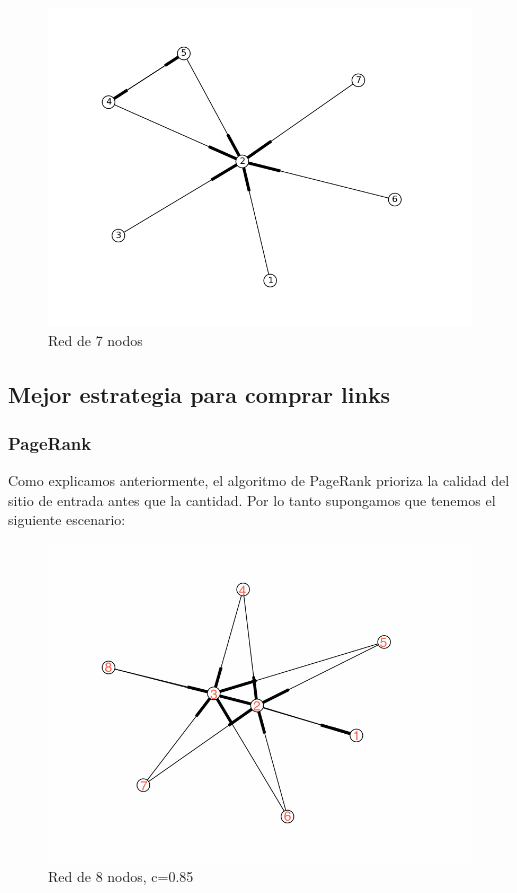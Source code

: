  \begin{figure}[!htb]
\begin{center}
    \includegraphics[scale=0.5]{imagenes/test4.png}
    \caption{Red de 7 nodos}
    \end{center}
\end{figure}

\subsection{Mejor estrategia para comprar links}
\subsubsection{PageRank}

Como explicamos anteriormente, el algoritmo de PageRank prioriza la calidad del sitio de entrada antes que la cantidad. Por lo tanto supongamos que tenemos el siguiente escenario:


 \begin{figure}[!htb]
\begin{center}
    \includegraphics[scale=0.5]{imagenes/test6.png}
    \caption{Red de 8 nodos, c=0.85}
    \end{center}
\end{figure}

